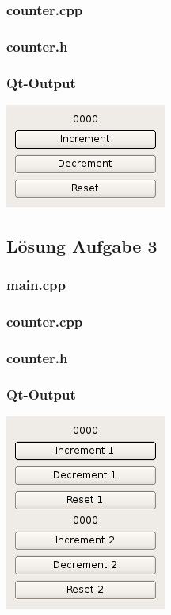 \subsubsection{counter.cpp}

\subsubsection{counter.h}

\subsubsection{Qt-Output}
\begin{center}
	\includegraphics[scale=.5]{./images/u12a2.png}
\end{center}

\subsection{Lösung Aufgabe 3}
\subsubsection{main.cpp}

\subsubsection{counter.cpp}

\subsubsection{counter.h}

\subsubsection{Qt-Output}
\begin{center}
	\includegraphics[scale=.5]{./images/u12a3.png}
\end{center}

